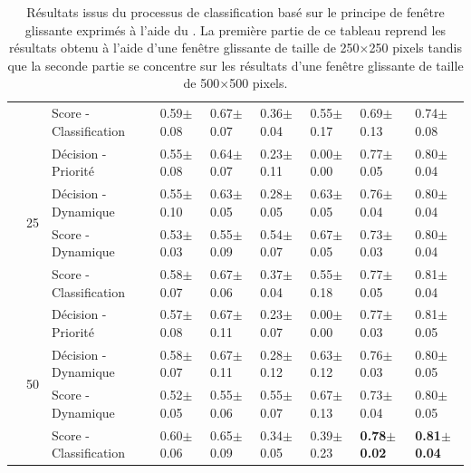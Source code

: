 \begin{landscape}
\begin{table}[]
\begin{tabular}{lllllllll}
							        &                                   & Score - Classification                    & 0.59$\pm$0.08         & 0.67$\pm$0.07     & 0.36$\pm$0.04         & 0.55$\pm$0.17     & 0.69$\pm$0.13         & 0.74$\pm$0.08         \\ \cline{2-9}
							        & \multirow{4}{*}{25}               & Décision - Priorité                    & 0.55$\pm$0.08         & 0.64$\pm$0.07     & 0.23$\pm$0.11         & 0.00$\pm$0.00     & 0.77$\pm$0.05         & 0.80$\pm$0.04         \\
							        &                                   & Décision - Dynamique                    & 0.55$\pm$0.10         & 0.63$\pm$0.05     & 0.28$\pm$0.05         & 0.63$\pm$0.05     & 0.76$\pm$0.04         & 0.80$\pm$0.04         \\
							        &                                   & Score - Dynamique               & 0.53$\pm$0.03         & 0.55$\pm$0.09     & 0.54$\pm$0.07         & 0.67$\pm$0.05     & 0.73$\pm$0.03         & 0.80$\pm$0.04         \\
							        &                                   & Score - Classification                    & 0.58$\pm$0.07         & 0.67$\pm$0.06     & 0.37$\pm$0.04         & 0.55$\pm$0.18     & 0.77$\pm$0.05         & 0.81$\pm$0.04         \\ \cline{2-9}
							        & \multirow{4}{*}{50}               & Décision - Priorité                    & 0.57$\pm$0.08         & 0.67$\pm$0.11     & 0.23$\pm$0.07         & 0.00$\pm$0.00     & 0.77$\pm$0.03         & 0.81$\pm$0.05         \\
							        &                                   & Décision - Dynamique                    & 0.58$\pm$0.07         & 0.67$\pm$0.11     & 0.28$\pm$0.12         & 0.63$\pm$0.12     & 0.76$\pm$0.03         & 0.80$\pm$0.05         \\
							        &                                   & Score - Dynamique               & 0.52$\pm$0.05         & 0.55$\pm$0.06     & 0.55$\pm$0.07         & 0.67$\pm$0.13     & 0.73$\pm$0.04         & 0.80$\pm$0.05         \\
		                            &                                   & Score - Classification                    & 0.60$\pm$0.06         & 0.65$\pm$0.09     & 0.34$\pm$0.05         & 0.39$\pm$0.23     & \textbf{0.78$\pm$0.02}& \textbf{0.81$\pm$0.04}\\
		\bottomrule
    \end{tabular}
    \caption{Résultats issus du processus de classification basé sur le principe de fenêtre glissante exprimés à l'aide du \fscore. La première partie de ce tableau reprend les résultats obtenu à l'aide d'une fenêtre glissante de taille de 250$\times$250 pixels tandis que la seconde partie se concentre sur les résultats d'une fenêtre glissante de taille de 500$\times$500 pixels.}
    \label{tab:results_image_improvement_sliding_window}
\end{table}
\end{landscape}

